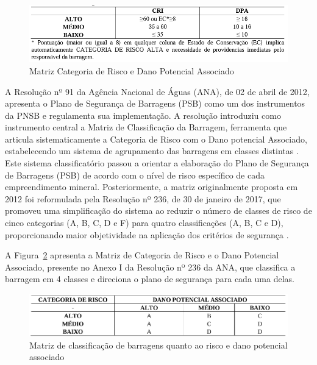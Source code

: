 \begin{figure}[htbp]
    \centering
    \includegraphics[width=\textwidth]{figures/image26_matriz_cri_e_dpa.png}
    \caption{Matriz Categoria de Risco e Dano Potencial Associado}
    \label{fig:matriz_cri_e_dpa}
\end{figure}

A Resolução nº 91 da Agência Nacional de Águas (ANA), de 02 de abril de 2012, apresenta o Plano de Segurança de Barragens (PSB) como um dos instrumentos da PNSB e regulamenta sua implementação. A resolução introduziu como instrumento central a Matriz de Classificação da Barragem, ferramenta que articula sistematicamente a Categoria de Risco com o Dano potencial Associado, estabelecendo um sistema de agrupamento das barragens em classes distintas \cite{carvalho2018, moecke2019}. Este sistema classificatório passou a orientar a elaboração do Plano de Segurança de Barragens (PSB) de acordo com o nível de risco específico de cada empreendimento mineral. Posteriormente, a matriz originalmente proposta em 2012 foi reformulada pela Resolução nº 236, de 30 de janeiro de 2017, que promoveu uma simplificação do sistema ao reduzir o número de classes de risco de cinco categorias (A, B, C, D e F) para quatro classificações (A, B, C e D), proporcionando maior objetividade na aplicação dos critérios de segurança \cite{carvalho2018, moecke2019}.

A Figura~\ref{fig:matriz_classificacao_ana} apresenta a Matriz de Categoria de Risco e o Dano Potencial Associado, presente no Anexo I da Resolução nº 236 da ANA, que classifica a barragem em 4 classes e direciona o plano de segurança para cada uma delas.

\begin{figure}[htbp]
    \centering
    \includegraphics[width=\textwidth]{figures/image27_matriz_de_classificacao_cri_e_dpa_ana.png}
    \caption{Matriz de classificação de barragens quanto ao risco e dano potencial associado}
    \label{fig:matriz_classificacao_ana}
\end{figure}

